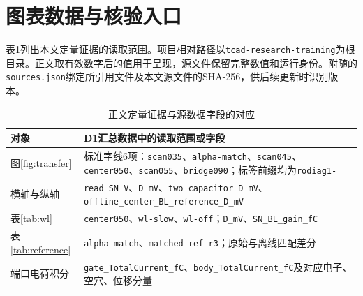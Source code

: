 \documentclass[UTF8,a4paper,zihao=-4,fontset=fandol]{ctexart}
\begin{document}
\appendix
\section{图表数据与核验入口}
表\ref{tab:trace}列出本文定量证据的读取范围。项目相对路径以\texttt{tcad-research-training}为根目录。正文取有效数字后的值用于呈现，源文件保留完整数值和运行身份。附随的\texttt{sources.json}绑定所引用文件及本文源文件的SHA-256，供后续更新时识别版本。

\begin{table}[htbp]
\centering\footnotesize
\caption{正文定量证据与源数据字段的对应}
\label{tab:trace}
\begin{tabularx}{\textwidth}{@{}p{3.0cm}X@{}}
\toprule
对象 & D1汇总数据中的读取范围或字段\\
\midrule
图\ref{fig:transfer} & 标准字线6项：\texttt{scan035}、\texttt{alpha-match}、\texttt{scan045}、\texttt{center050}、\texttt{scan055}、\texttt{bridge090}；标签前缀均为\texttt{rodiag1-}\\
横轴与纵轴 & \texttt{read\_SN\_V}、\texttt{D\_mV}、\texttt{two\_capacitor\_D\_mV}、\texttt{offline\_center\_BL\_reference\_D\_mV}\\
表\ref{tab:wl} & \texttt{center050}、\texttt{wl-slow}、\texttt{wl-off}；\texttt{D\_mV}、\texttt{SN\_BL\_gain\_fC}\\
表\ref{tab:reference} & \texttt{alpha-match}、\texttt{matched-ref-r3}；原始与离线匹配差分\\
端口电荷积分 & \texttt{gate\_TotalCurrent\_fC}、\texttt{body\_TotalCurrent\_fC}及对应电子、空穴、位移分量\\
\bottomrule
\end{tabularx}
\end{table}
\end{document}
